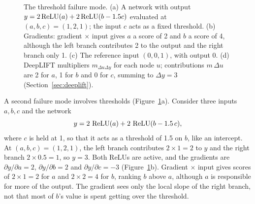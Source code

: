 \begin{figure}[t]
  \centering
  \newcommand{\thrnet}[9]{%
    \node[nn] (a) at (0,0) {$#1$}; \node[nn] (b) at (1.4,0) {$#2$}; \node[nn] (c) at (2.8,0) {$#3$};
    \node[nn] (za) at (0,1.2) {$#4$}; \node[nn] (ra) at (0,2.2) {$#5$};
    \node[nn] (zb) at (2.1,1.2) {$#6$}; \node[nn] (rb) at (2.1,2.2) {$#7$};
    \node[nn] (y) at (1.05,3.3) {$#8$};
    \draw (a) -- node[wlab, left] {$1$} (za); \draw (za) -- (ra);
    \draw (b) -- node[wlab, left] {$1$} (zb); \draw (c) -- node[wlab, right] {$-1.5$} (zb); \draw (zb) -- (rb);
    \draw (ra) -- node[wlab, left] {$2$} (y); \draw (rb) -- node[wlab, right] {$2$} (y);
    \node[font=\footnotesize, below] at (a.south) {$a$}; \node[font=\footnotesize, below] at (b.south) {$b$};
    \node[font=\footnotesize, below] at (c.south) {$c$};
    \node[font=\small\bfseries, anchor=west] at (-0.5,4.0) {#9};}
  \caption{The threshold failure mode. (a) A network with output $y=2\operatorname{ReLU}(a)+2\operatorname{ReLU}(b-1.5c)$ evaluated at $(a,b,c)=(1,2,1)$; the input $c$ acts as a fixed threshold. (b) Gradients: gradient $\times$ input gives $a$ a score of 2 and $b$ a score of 4, although the left branch contributes 2 to the output and the right branch only 1. (c) The reference input $(0,0,1)$, with output 0. (d) DeepLIFT multipliers $m_{\Delta u\Delta y}$ for each node $u$; contributions $m\,\Delta u$ are 2 for $a$, 1 for $b$ and 0 for $c$, summing to $\Delta y=3$ (Section~\ref{sec:deeplift}).}
  \label{fig:threshold}
\end{figure}

A second failure mode involves thresholds (Figure~\ref{fig:threshold}a). Consider three inputs $a,b,c$ and the network
\begin{equation}
  y = 2\,\operatorname{ReLU}(a) + 2\,\operatorname{ReLU}(b - 1.5\,c),
\end{equation}
where $c$ is held at 1, so that it acts as a threshold of 1.5 on $b$, like an intercept. At $(a,b,c)=(1,2,1)$, the left branch contributes $2\times 1=2$ to $y$ and the right branch $2\times 0.5=1$, so $y=3$. Both ReLUs are active, and the gradients are $\partial y/\partial a=2$, $\partial y/\partial b=2$ and $\partial y/\partial c=-3$ (Figure~\ref{fig:threshold}b). Gradient $\times$ input gives scores of $2\times1=2$ for $a$ and $2\times 2=4$ for $b$, ranking $b$ above $a$, although $a$ is responsible for more of the output. The gradient sees only the local slope of the right branch, not that most of $b$'s value is spent getting over the threshold.

